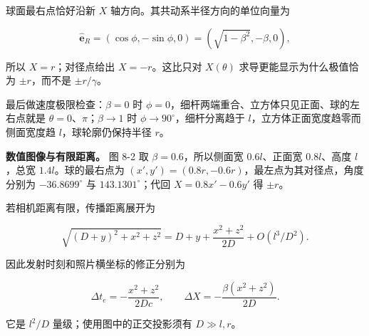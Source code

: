 \documentclass[12pt,a4paper,UTF8]{ctexart}
\begin{document}
球面最右点恰好沿新 \(X\) 轴方向。其共动系半径方向的单位向量为

\[\hat{\bm e}_R=(\cos\phi,-\sin\phi,0)
=(\sqrt{1-\beta^2},-\beta,0),\]

所以 \(X=r\)；对径点给出 \(X=-r\)。这比只对 \(X(\theta)\)
求导更能显示为什么极值恰为 \(\pm r\)，而不是 \(\pm r/\gamma\)。

最后做速度极限检查：\(\beta=0\) 时
\(\phi=0\)，细杆两端重合、立方体只见正面、球的左右点就是
\(\theta=0\)、\(\pi\)；\(\beta\to1\) 时
\(\phi\to90^\circ\)，细杆分离趋于 \(l\)，立方体正面宽度趋零而侧面宽度趋
\(l\)，球轮廓仍保持半径 \(r\)。

\textbf{数值图像与有限距离。} 图 8-2 取 \(\beta=0.6\)，所以侧面宽
\(0.6l\)、正面宽 \(0.8l\)、高度 \(l\)，总宽 \(1.4l\)。球的最右点为
\((x',y')=(0.8r,-0.6r)\)，最左点为其对径点，角度分别为
\(-36.8699^\circ\) 与 \(143.1301^\circ\)；代回 \(X=0.8x'-0.6y'\) 得
\(\pm r\)。

若相机距离有限，传播距离展开为

\[\sqrt{(D+y)^2+x^2+z^2}=D+y+\frac{x^2+z^2}{2D}+O(l^3/D^2).\]

因此发射时刻和照片横坐标的修正分别为

\[\Delta t_e=-\frac{x^2+z^2}{2Dc},\qquad \Delta X=-\frac{\beta(x^2+z^2)}{2D}.\]

它是 \(l^2/D\) 量级；使用图中的正交投影须有 \(D\gg l,r\)。
\end{document}

